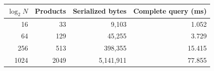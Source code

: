 \begin{tabular}{rrrr}
\toprule
$\log_2 N$ & Products & Serialized bytes & Complete query (ms) \\
\midrule
16 & 33 & 9,103 & 1.052 \\
64 & 129 & 45,255 & 3.729 \\
256 & 513 & 398,355 & 15.415 \\
1024 & 2049 & 5,141,911 & 77.855 \\
\bottomrule
\end{tabular}
